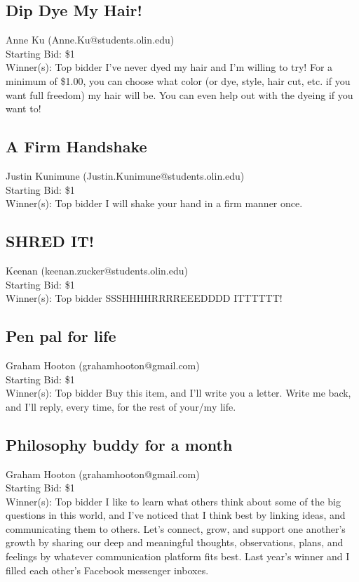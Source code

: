 \documentclass[11pt]{article}
\begin{document}
\subsection{Dip Dye My Hair!}
Anne Ku (Anne.Ku@students.olin.edu) \\
Starting Bid: \$1 \\
Winner(s): 
Top bidder\newline
I've never dyed my hair and I'm willing to try! For a minimum of \$1.00, you can choose what color (or dye, style, hair cut, etc. if you want full freedom) my hair will be. You can even help out with the dyeing if you want to!
\subsection{A Firm Handshake}
Justin Kunimune (Justin.Kunimune@students.olin.edu) \\
Starting Bid: \$1 \\
Winner(s): 
Top bidder\newline
I will shake your hand in a firm manner once.
\subsection{SHRED IT!}
Keenan  (keenan.zucker@students.olin.edu) \\
Starting Bid: \$1 \\
Winner(s): 
Top bidder\newline
SSSHHHHRRRREEEDDDD ITTTTTT!
\subsection{Pen pal for life}
Graham Hooton (grahamhooton@gmail.com) \\
Starting Bid: \$1 \\
Winner(s): 
Top bidder\newline
Buy this item, and I’ll write you a letter. Write me back, and I’ll reply, every time, for the rest of your/my life.
\subsection{Philosophy buddy for a month}
Graham Hooton (grahamhooton@gmail.com) \\
Starting Bid: \$1 \\
Winner(s): 
Top bidder\newline
I like to learn what others think about some of the big questions in this world, and I’ve noticed that I think best by linking ideas, and communicating them to others. Let’s connect, grow, and support one another’s growth by sharing our deep and meaningful thoughts, observations, plans, and feelings by whatever communication platform fits best. Last year’s winner and I filled each other’s Facebook messenger inboxes.
\end{document}
